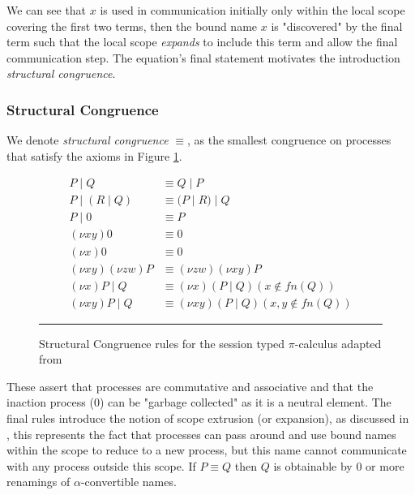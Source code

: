 We can see that $x$ is used in communication initially only within the local scope covering the first two terms, then the bound name $x$ is "discovered" by the final term such that the local scope \textit{expands} to include this term and allow the final communication step. The equation's final statement motivates the introduction \textit{structural congruence}.

\subsubsection{Structural Congruence}
We denote \textit{structural congruence} $\equiv$, as the smallest congruence on processes that satisfy the axioms in Figure \ref{fig:congSes}. 

\begin{figure}[h]
    \centering
    \begin{equation*}
        \begin{split}
            P \; | \; Q & \equiv Q \; | \; P \\
            P \; | \; (R \; | \; Q) & \equiv (P \; | \; R) \; | \; Q \\
            P \; | \; 0 & \equiv P\\
            (\nu xy) 0 & \equiv 0\\
            (\nu x) 0 & \equiv 0\\
            (\nu xy) (\nu zw) P & \equiv (\nu zw) (\nu xy) P\\
            (\nu x) P \; | \; Q & \equiv (\nu x) (P \; | \; Q) (x \not \in fn(Q) )\\
            (\nu xy) P \; | \; Q & \equiv (\nu xy) (P \; | \; Q) (x,y \not \in fn(Q))
        \end{split}
    \end{equation*}
    \noindent\rule{12cm}{0.8pt}
    \caption{Structural Congruence rules for the session typed $\pi$-calculus adapted from \citep{dardha2017session}}
    \label{fig:congSes}
\end{figure}

These assert that processes are commutative and associative and that the inaction process ($0$) can be "garbage collected" as it is a neutral element. The final rules introduce the notion of scope extrusion (or expansion), as discussed in \citep{sangiorgi2003pi}, this represents the fact that processes can pass around and use bound names within the scope to reduce to a new process, but this name cannot communicate with any process outside this scope. If $P \equiv Q$ then $Q$ is obtainable by 0 or more renamings of $\alpha$-convertible names. 

